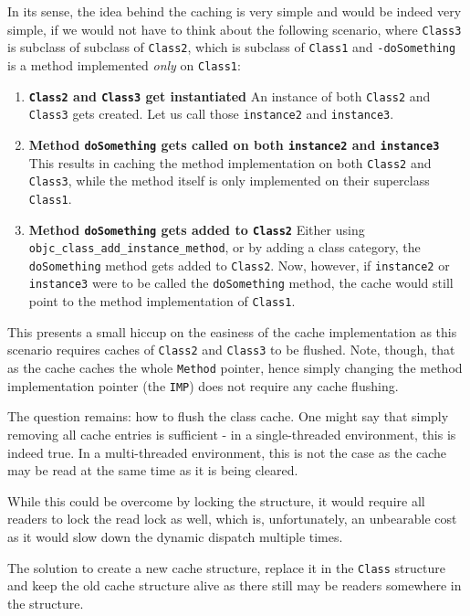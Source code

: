In its sense, the idea behind the caching is very simple and would be indeed very simple, if we would not have to think about the following scenario, where \verb=Class3= is subclass of subclass of \verb=Class2=, which is subclass of \verb=Class1= and \verb=-doSomething= is a method implemented \emph{only} on \verb=Class1=:

\begin{enumerate}
  \item{\bf{\verb=Class2= and \verb=Class3= get instantiated}} An instance of both \verb=Class2= and \verb=Class3= gets created. Let us call those \verb=instance2= and \verb=instance3=.
  \item{\bf{Method \verb=doSomething= gets called on both \verb=instance2= and \verb=instance3=}} This results in caching the method implementation on both \verb=Class2= and \verb=Class3=, while the method itself is only implemented on their superclass \verb=Class1=.
  \item{\bf{Method \verb=doSomething= gets added to \verb=Class2=}} Either using \newline{}\verb=objc_class_add_instance_method=, or by adding a class category, the \verb=doSomething= method gets added to \verb=Class2=. Now, however, if \verb=instance2= or \verb=instance3= were to be called the \verb=doSomething= method, the cache would still point to the method implementation of \verb=Class1=.
\end{enumerate}

This presents a small hiccup on the easiness of the cache implementation as this scenario requires caches of \verb=Class2= and \verb=Class3= to be flushed. Note, though, that as the cache caches the whole \verb=Method= pointer, hence simply changing the method implementation pointer (the \verb=IMP=) does not require any cache flushing.

The question remains: how to flush the class cache. One might say that simply removing all cache entries is sufficient - in a single-threaded environment, this is indeed true. In a multi-threaded environment, this is not the case as the cache may be read at the same time as it is being cleared.

While this could be overcome by locking the structure, it would require all readers to lock the read lock as well, which is, unfortunately, an unbearable cost as it would slow down the dynamic dispatch multiple times.

The solution to create a new cache structure, replace it in the \verb=Class= structure and keep the old cache structure alive as there still may be readers somewhere in the structure.

